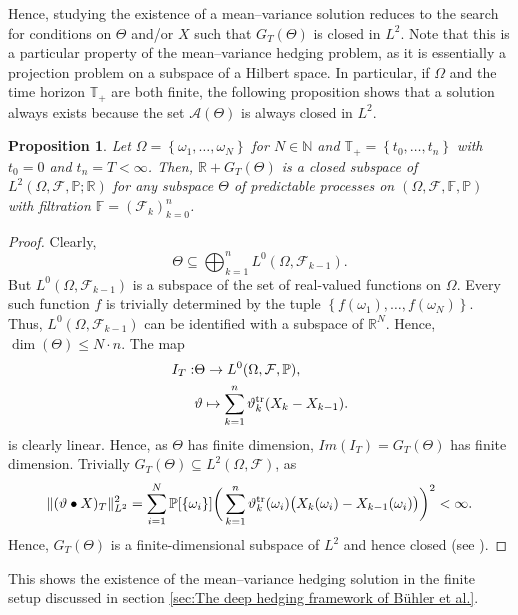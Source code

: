 \documentclass[11pt,a4paper,twoside,openany]{report}
\numberwithin{equation}{section}
\theoremstyle{plain} %
\newtheorem{proposition}[theorem]{Proposition}
\theoremstyle{definition} %
\theoremstyle{remark} %
\let\parencite\authnumparencite
\begin{document}
Hence, studying the existence of a mean--variance solution reduces to the search for conditions on \(\Theta\) and/or \(X\) such that \(G_T(\Theta)\) is closed in \(L^2\). Note that this is a particular property of the mean--variance hedging problem, as it is essentially a projection problem on a subspace of a Hilbert space. In particular, if \(\Omega\) and the time horizon \(\mathbb{T}_+\) are both finite, the following proposition shows that a solution always exists because the set \(\mathcal{A}(\Theta)\) is always closed in \(L^2\).
\begin{proposition}\label{prop:existence of finite deep mean--variance solution}
    Let \(\Omega=\left\{\omega_1,\dots,\omega_N\right\}\) for \(N\in\mathbb{N}\) and \(\mathbb{T}_+=\left\{t_0,\dots,t_n\right\}\) with \(t_0=0\) and \(t_n=T<\infty\). Then, \(\mathbb{R}+G_T(\Theta)\) is a closed subspace of \(L^2(\Omega,\mathcal{F},\mathbb{P};\mathbb{R})\) for any subspace \(\Theta\) of predictable processes on \((\Omega,\mathcal{F},\mathbb{F},\mathbb{P})\) with filtration \(\mathbb{F}=(\mathcal{F}_k)_{k=0}^{n}\).
\end{proposition}
\begin{proof}
    Clearly, 
    \begin{equation*}
        \Theta\subseteq\bigoplus_{k=1}^{n} L^0(\Omega,\mathcal{F}_{k-1}).
    \end{equation*}
    But \( L^0(\Omega,\mathcal{F}_{k-1})\) is a subspace of the set of real-valued functions on \(\Omega\). Every such function \(f\) is trivially determined by the tuple \(\left\{f(\omega_1),\dots,f(\omega_N)\right\}\). Thus, \( L^0(\Omega,\mathcal{F}_{k-1})\) can be identified with a subspace of \(\mathbb{R}^N\). Hence, \(\dim(\Theta)\leq N\cdot n\). The map 
    \begin{align*}
        I_T:&\Theta\to  L^0(\Omega,\mathcal{F},\mathbb{P}),
        \\&\vartheta\mapsto\sum_{k=1}^n\vartheta_k^{\rm{tr}}(X_{k}-X_{k-1}).
    \end{align*}
    is clearly linear. Hence, as \(\Theta\) has finite dimension, \(Im(I_T)=G_T(\Theta)\) has finite dimension. Trivially \(G_T(\Theta)\subseteq L^2(\Omega,\mathcal{F})\), as 
    \begin{equation}\label{eq:L2 norm in finite setup is double sum}
        \lVert (\vartheta\bullet X)_T\rVert_{L^2}^2=\sum_{i=1}^N\mathbb{P}[\{\omega_i\}]\bigg(\sum_{k=1}^n\vartheta_k^{\rm{tr}}(\omega_i)\big(X_k(\omega_i)-X_{k-1}(\omega_i)\big)\bigg)^2<\infty.
    \end{equation}
    Hence, \(G_T(\Theta)\) is a finite-dimensional subspace of \(L^2\) and hence closed (see \parencite[Cor.~1.22]{Buehler2018DeepHedging}).
\end{proof}
This shows the existence of the mean--variance hedging solution in the finite setup discussed in section \ref{sec:The deep hedging framework of Bühler et al.}.
\end{document}

